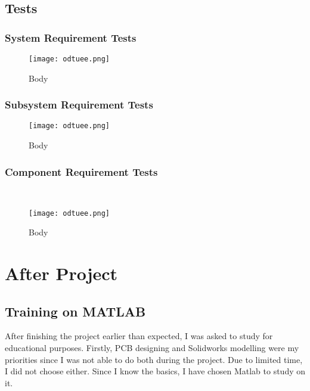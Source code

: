 \subsection{Tests}

\subsubsection{System Requirement Tests}



\begin{figure}[H]
\texttt{[image: odtuee.png]}\\[1cm]
\caption{\label{fig:cooling}Body }
\end{figure}


\subsubsection{Subsystem Requirement Tests}




\begin{figure}[H]
\texttt{[image: odtuee.png]}\\[1cm]
\caption{\label{fig:cooling}Body }
\end{figure}


\subsubsection{Component Requirement Tests}   

\
   
\begin{figure}[H]

\texttt{[image: odtuee.png]}\\[1cm]
\caption{\label{fig:cooling}Body }
\end{figure}
 
   
\section{After Project}


\subsection{Training on MATLAB}

\-
\indent After finishing the project earlier than expected, I was asked to study for educational purposes. Firstly, PCB designing and Solidworks modelling were my priorities since I was not able to do both during the project. Due to limited time, I did not choose either. Since I know the basics, I have chosen Matlab to study on it.
